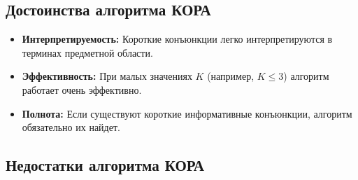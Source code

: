 \subsection{Достоинства алгоритма КОРА}

\begin{itemize}
    \item \textbf{Интерпретируемость:} Короткие конъюнкции легко интерпретируются в терминах предметной области.
    \item \textbf{Эффективность:} При малых значениях \(K\) (например, \(K \leq 3\)) алгоритм работает очень эффективно.
    \item \textbf{Полнота:} Если существуют короткие информативные конъюнкции, алгоритм обязательно их найдет.
\end{itemize}

\subsection{Недостатки алгоритма КОРА}

